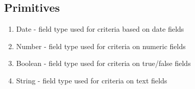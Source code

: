 \subsection{Primitives}
\begin{enumerate}
\item Date - field type used for criteria based on date fields
\item Number - field type used for criteria on numeric fields
\item Boolean - field type used for criteria on true/false fields
\item String - field type used for criteria on text fields
\end{enumerate}